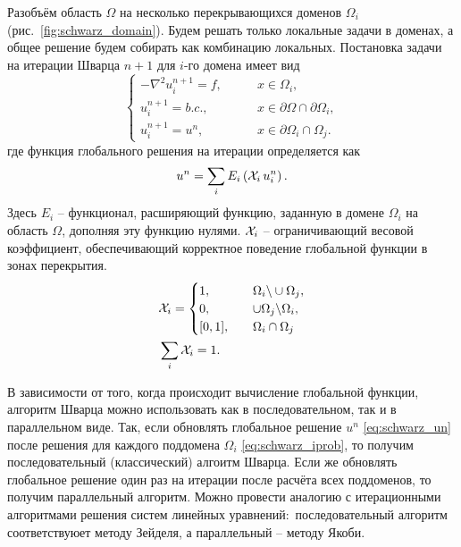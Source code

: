 Разобъём область $\Omega$ на несколько перекрывающихся доменов $\Omega_i$ (рис.~\ref{fig:schwarz_domain}).
Будем решать только локальные задачи в доменах, а общее решение будем собирать как комбинацию локальных.
Постановка задачи на итерации Шварца $n+1$ для $i$-го домена имеет вид
\begin{equation}
\begin{cases}
\label{eq:schwarz_iprob}
-\nabla^2 u_i^{n+1} = f, \qquad &x\in\Omega_i,  \\
u_i^{n+1} = b.c., \qquad &x\in\partial\Omega \cap \partial\Omega_i, \\
u_i^{n+1} = u^n, \qquad &x\in\partial\Omega_i \cap \Omega_j.
\end{cases}
\end{equation}
где функция глобального решения на итерации определяется как
\begin{equation}
\label{eq:schwarz_un}
u^n = \sum_i E_i\left(\mathcal{X}_i \, u_i^{n}\right).
\end{equation}
Здесь $E_i$ -- функционал, расширяющий функцию, заданную в домене $\Omega_i$ на область $\Omega$, дополняя эту функцию нулями.
$\mathcal{X}_i$ -- ограничивающий весовой коэффициент, обеспечивающий корректное поведение глобальной функции в зонах перекрытия.
\begin{equation}
\label{eq:schwarz_chi}
\begin{aligned}
& \mathcal{X}_i = \begin{cases}
   1, \qquad &\Omega_i \backslash \cup \Omega_j, \\
   0, \qquad &\cup \Omega_j \backslash \Omega_i, \\
   [0, 1], \quad & \Omega_i \cap \Omega_j
  \end{cases} \\
& \sum_i \mathcal{X}_i = 1.
\end{aligned}
\end{equation}

В зависимости от того, когда происходит вычисление глобальной функции, алгоритм Шварца можно
использовать как в последовательном, так и в параллельном виде.
Так, если обновлять глобальное решение $u^n$ \cref{eq:schwarz_un} после решения
для каждого поддомена $\Omega_i$ \cref{eq:schwarz_iprob}, то получим последовательный (классический) алгоитм Шварца.
Если же обновлять глобальное решение один раз на итерации после расчёта всех поддоменов, то
получим параллельный алгоритм.
Можно провести аналогию с итерационными алгоритмами решения систем линейных уравнений:\
последовательный алгоритм соответствуюет методу Зейделя, а параллельный -- методу Якоби. 

